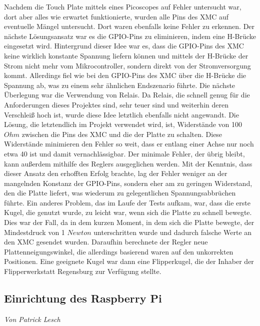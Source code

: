 \documentclass[12pt,a4paper,bibliography=totoc,listof=totoc]{scrartcl}
\begin{document}
Nachdem die Touch Plate mittels eines Picoscopes auf Fehler untersucht war, dort aber alles wie erwartet funktionierte, wurden alle Pins des XMC auf eventuelle Mängel untersucht. Dort waren ebenfalls keine Fehler zu erkennen.\newline
Der nächste Lösungsansatz war es die GPIO-Pins zu eliminieren, indem eine H-Brücke eingesetzt wird. Hintergrund dieser Idee war es, dass die GPIO-Pins des XMC keine wirklich konstante Spannung liefern können und mittels der H-Brücke der Strom nicht mehr vom Mikrocontroller, sondern direkt von der Stromversorgung kommt. Allerdings fiel wie bei den GPIO-Pins des XMC über die H-Brücke die Spannung ab, was zu einem sehr ähnlichen Endszenario führte. Die nächste Überlegung war die Verwendung von Relais. Da Relais, die schnell genug für die Anforderungen dieses Projektes sind, sehr teuer sind und weiterhin deren Verschleiß hoch ist, wurde diese Idee letztlich ebenfalls nicht angewandt.\newline
Die Lösung, die letztendlich im Projekt verwendet wird, ist, Widerstände von 100 $Ohm$ zwischen die Pins des XMC und die der Platte zu schalten. Diese Widerstände minimieren den Fehler so weit, dass er entlang einer Achse nur noch etwa 40 ist und damit vernachlässigbar. Der minimale Fehler, der übrig bleibt, kann außerdem mithilfe des Reglers ausgeglichen werden.
Mit der Kenntnis, dass dieser Ansatz den erhofften Erfolg brachte, lag der Fehler weniger an der mangelnden Konstanz der GPIO-Pins, sondern eher am zu geringen Widerstand, den die Platte liefert, was wiederum zu gelegentlichen Spannungsabbrüchen führte.\newline
Ein anderes Problem, das im Laufe der Tests aufkam, war, dass die erste Kugel, die genutzt wurde, zu leicht war, wenn sich die Platte zu schnell bewegte. Dies war der Fall, da in dem kurzen Moment, in dem sich die Platte bewegte, der Mindestdruck von 1 $Newton$ unterschritten wurde und dadurch falsche Werte an den XMC gesendet wurden. Daraufhin berechnete der Regler neue Plattenneigungswinkel, die allerdings basierend waren auf den unkorrekten Positionen. Eine geeignete Kugel war dann eine Flipperkugel, die der Inhaber der Flipperwerkstatt Regensburg zur Verfügung stellte.


\subsection{Einrichtung des Raspberry Pi}
\textit{Von Patrick Lesch}
\end{document}
